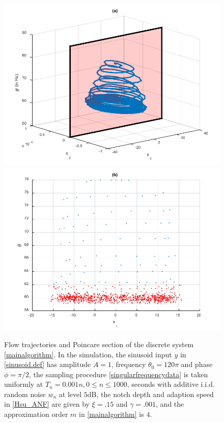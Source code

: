 \documentclass{UCF_ETD}
\begin{document}
\begin{figure}[H]
\begin{center}
\includegraphics[scale=0.8]{NonuniformANF/PoinCareMap}
\includegraphics[scale=0.8]{NonuniformANF/PoinCareSection11}
\caption{Flow trajectories and Poincare section of the discrete  system \eqref{mainalgorithm}. %
 In the simulation, the sinusoid input $y$
in \eqref{sinusoid.def} has amplitude $A=1$,  frequency $\theta_0=120 \pi$ and
phase $\phi=\pi/2$,
the sampling  procedure
\eqref{singularfrequencydata} is taken uniformly at   $T_n=0.001n, 0\le n\le 1000$, seconds
with additive i.i.d. random noise $w_n$ at level $5$dB,
 the notch  depth  and adaption speed in \eqref{Hsu_ANF} are given by
 $\xi=.15$ and $\gamma=.001$, and the approximation order $m$ in \eqref{mainalgorithm} is $4$.}
\label{PoincareMap_Trajectory.fig}
\end{center}
\end{figure}
\end{document}
